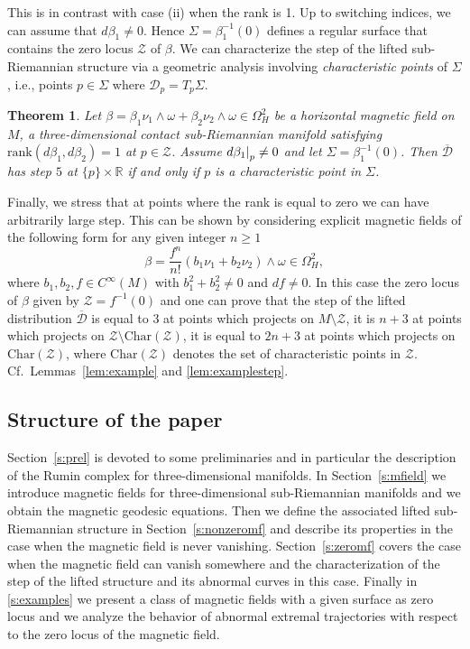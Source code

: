 \documentclass{amsart}
\theoremstyle{plain}
\newtheorem{theorem}{Theorem}
\theoremstyle{definition}
\theoremstyle{remark}
\newcommand{\R}{\mathbb{R}}
\newcommand{\diff}{d}%
\newcommand{\sr}{sub-{R}ie\-man\-nian }
\newcommand{\distr}{\mathcal{D}}								%
\newcommand{\B}{\beta}
\newcommand{\lift}[1]{\overline{#1}} 							%
\newcommand{\mg}{\B_1\nu_1\wedge \omega
										+\B_2\nu_2\wedge \omega}	%
\newcommand\restr[2]{{													%
  \left.\kern-\nulldelimiterspace 					
  #1 																			
  \right|_{#2} 														
  }}
\begin{document}
This is in contrast with case (ii) when the rank is 1. Up to switching indices, we can assume that $\diff \B_1\neq 0$.
 Hence $\Sigma=\beta_{1}^{-1}(0)$ defines a regular surface that contains the zero locus $\mathcal Z$ of $\beta$. We can characterize the step of the lifted \sr structure via a geometric analysis involving {\em characteristic points} of $\Sigma$, i.e., points $p\in \Sigma$ where  $\distr_p=T_p\Sigma$. 
\begin{theorem}\label{intro:rank1}
Let  $\B=\mg\in\Omega^2_H$ be a horizontal magnetic field on $M$, a three-dimensional contact \sr manifold satisfying $\mathrm{rank}\left(\diff\B_1,\diff\B_2\right)=1$ at $p\in \mathcal{Z}$.
Assume $\restr{\diff \B_1}{p}\neq 0$
and let $\Sigma=\B_1^{-1}(0)$.
Then $\lift\distr$ has step $5$ at $\{p\}\times \R$ if and only if $p$ is a characteristic point in $\Sigma$.
\end{theorem}

Finally, we stress that at points where the rank is equal to zero we can have arbitrarily large step. This can be shown by considering explicit magnetic fields of the following form for any given integer $n\geq 1$ 
\begin{equation}
\B=\frac{f^n}{n!}(b_1\nu_1+b_2\nu_2)\wedge\omega\in \Omega^2_H,
\end{equation}
where $b_1,b_2,f\in C^\infty(M)$ with $b_1^2+b_2^2\neq 0$ and $\diff f\neq 0$.
In this case the zero locus of $\B$ given by $\mathcal{Z}=f^{-1}(0)$ and one can prove that the step of the lifted distribution $\lift\distr$ is equal to $3$ at points which projects on $M \setminus \mathcal{Z}$, it is $n+3$ at points which projects on $\mathcal{Z}\setminus \mathrm{Char}(\mathcal{Z})$, it is equal to $2n+3$ at points which projects on $ \mathrm{Char}(\mathcal{Z})$, where $ \mathrm{Char}(\mathcal{Z})$ denotes the set of characteristic points in $\mathcal{Z}$. Cf.\ Lemmas~\ref{lem:example} and \ref{lem:examplestep}.



\subsection{Structure of the paper} 
Section~\ref{s:prel} is devoted to some preliminaries and in particular the description of the Rumin complex for three-dimensional manifolds. In Section~\ref{s:mfield} we introduce magnetic fields for three-dimensional sub-Riemannian manifolds and we obtain the magnetic geodesic equations. Then we define the associated lifted sub-Riemannian structure in Section~\ref{s:nonzeromf} and describe its properties in the case when the magnetic field is never vanishing. Section~\ref{s:zeromf} covers the case when the magnetic field can vanish somewhere and the characterization of the step of the lifted structure and its abnormal curves in this case. 
Finally in \cref{s:examples} we present a class of magnetic fields with a given surface as zero locus and we analyze the behavior of abnormal extremal trajectories with respect to the zero locus of the magnetic field.
\end{document}
